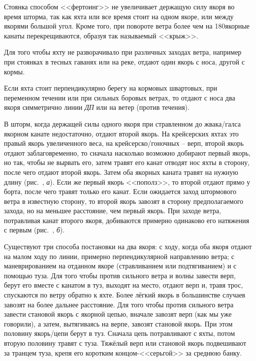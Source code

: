 Стоянка способом <<фертоинг>> не увеличивает держащую силу якоря во
время шторма, так как яхта или все время стоит на одном якоре, или
между якорями большой угол. Кроме того, при повороте ветра более чем
на 180\gr якорные канаты перекрещиваются, образуя так называемый
<<крыж>>.

Для того чтобы яхту не разворачивало при различных заходах ветра,
например при стоянках в тесных гаванях или на реке, отдают один якорь
с носа, другой с кормы.

Если яхта стоит перпендикулярно берегу на кормовых швартовых, при
переменном течении или при сильных боровых ветрах, то отдают с носа
два якоря симметрично линии \textit{ДП} или на ветер (против течения).

В шторм, когда держащей силы одного якоря при стравленном до
жвака\-/галса якорном канате недостаточно, отдают второй якорь. На
крейсерских яхтах это правый якорь увеличенного веса, на
крейсерско\-/гоночных \--- верп, второй якорь отдают заблаговременно,
то сначала насколько возможно добирают первый якорь, но так, чтобы не
вырвать его, затем травят его канат отводят нос яхты в сторону, после
чего отдают второй якорь. Затем оба якорных каната травят на нужную
длину (рис.~, \textit{а}). Если же первый якорь <<пополз>>,
то второй отдают прямо у борта, после чего травят только его
канат. Если ожидается заход штормового ветра в известную сторону, то
второй якорь завозят в сторону предполагаемого захода, но на меньшее
расстояние, чем первый якорь. При заходе ветра, потравливая канат
второго якоря, добиваются примерно одинаково его натяжения с первым
(рис.~, \textit{б}).

Существуют три способа постановки на два якоря: с ходу, когда оба
якоря отдают на малом ходу по линии, примерно перпендикулярной
направлению ветра; с маневрированием на отданном якоре (стравливанием
или подтягиванием) и с помощью туза. Для того чтобы против сильного
ветра и волны завести верп, берут его вместе с канатом в туз, выходят
на место, отдают верп и, травя трос, спускаются по ветру обратно к
яхте. Более лёгкий якорь в большинстве случаев завозят на более
дальнее расстояние. Для того чтобы против сильного ветра завести
становой якорь с якорной цепью, вначале завозят верп (как мы уже
говорили), а затем, вытягиваясь на верпе, завозят становой якорь. При
этом половину якорь\-/цепи берут в туз. Сначала цепь потравливают с
яхты, потом вторую половину травят с туза. Тяжёлый верп или становой
якорь подвешивают за транцем туза, крепя его коротким
концом-<<серьгой>> за среднюю банку.

